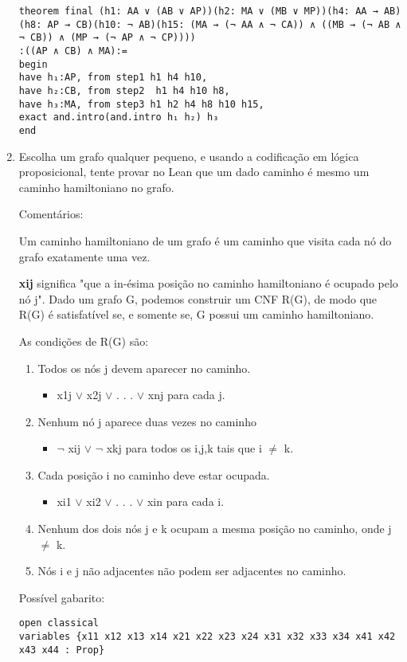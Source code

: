\begin{enumerate}
\begin{lstlisting}
theorem final (h1: AA ∨ (AB ∨ AP))(h2: MA ∨ (MB ∨ MP))(h4: AA → AB)
(h8: AP → CB)(h10: ¬ AB)(h15: (MA → (¬ AA ∧ ¬ CA)) ∧ ((MB → (¬ AB ∧ ¬ CB)) ∧ (MP → (¬ AP ∧ ¬ CP))))
:((AP ∧ CB) ∧ MA):=
begin
have h₁:AP, from step1 h1 h4 h10,
have h₂:CB, from step2  h1 h4 h10 h8,
have h₃:MA, from step3 h1 h2 h4 h8 h10 h15,
exact and.intro(and.intro h₁ h₂) h₃ 
end

\end{lstlisting}
\bigbreak
\item Escolha um grafo qualquer pequeno, e usando a codificação em lógica proposicional, tente provar no Lean que um dado caminho é mesmo um caminho hamiltoniano no grafo.

Comentários:

Um caminho hamiltoniano de um grafo é um caminho que visita cada nó do grafo exatamente uma vez.

\textbf{xij} significa "que a in-ésima posição no caminho hamiltoniano é ocupado pelo nó j".
Dado um grafo G, podemos construir um CNF R(G), de modo que R(G) é satisfatível se, e somente se, G possui um caminho hamiltoniano.

As condições de R(G) são:
\begin{enumerate}
    \item Todos os nós j devem aparecer no caminho. 
    \begin{itemize}
    \item x1j $\lor$ x2j $\lor$ . . . $\lor$ xnj para cada j.
    \end{itemize}
    \item Nenhum nó j aparece duas vezes no caminho
    \begin{itemize}
    \item $\neg$ xij $\lor$ $\neg$ xkj para todos os i,j,k tais que i $\neq $ k.
    \end{itemize}
    \item Cada posição i no caminho deve estar ocupada.
    \begin{itemize}
    \item xi1 $\lor$ xi2 $\lor$ . . . $\lor$ xin para cada i.
    \end{itemize}
    \item Nenhum dos dois nós j e k ocupam  a mesma posição no caminho, onde j $\neq $ k.
    \item Nós i e j não adjacentes não podem ser adjacentes no caminho. 
\end{enumerate}

\bigbreak
Possível gabarito:
\begin{lstlisting}
open classical 
variables {x11 x12 x13 x14 x21 x22 x23 x24 x31 x32 x33 x34 x41 x42 x43 x44 : Prop}


\end{lstlisting}
\end{enumerate}
